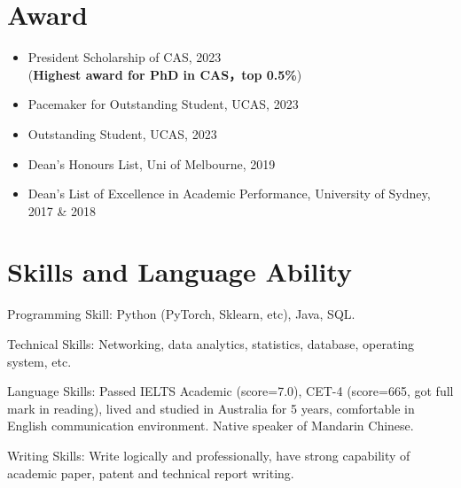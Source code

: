 \documentclass[letterpaper,10.9pt]{article}
\begin{document}




\section{\textbf{Award}}
\vspace{-5mm}
\begin{multicols}{2}
\begin{itemize}
  \setlength\itemsep{1.8pt}
  \item President Scholarship of CAS, 2023\\(\textbf{Highest award for PhD in CAS，top 0.5\%})
  \item Pacemaker for Outstanding Student, UCAS, 2023
  \item Outstanding Student, UCAS, 2023
  \item Dean's Honours List, Uni of Melbourne, 2019
  \item Dean's List of Excellence in Academic Performance, University of Sydney, 2017 \& 2018
\end{itemize}
\end{multicols}





\section{\textbf{Skills and Language Ability}}
Programming Skill: Python (PyTorch, Sklearn, etc), Java, SQL. 

Technical Skills: Networking, data analytics, statistics, database, operating system, etc. 

Language Skills: Passed IELTS Academic (score=7.0), CET-4 (score=665, got full mark in reading), lived and studied in Australia for 5 years, comfortable in English communication environment. Native speaker of Mandarin Chinese. 

Writing Skills: Write logically and professionally, have strong capability of academic paper, patent and technical report writing. 
\end{document}
